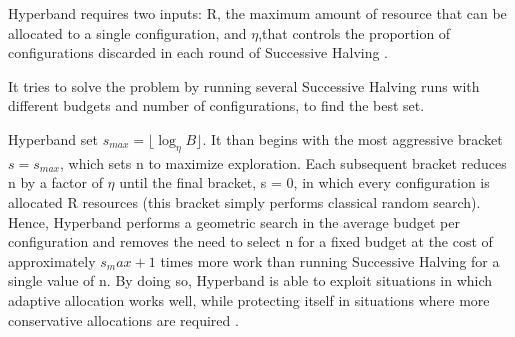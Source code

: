 Hyperband requires two inputs: R, the maximum amount of resource that can
be allocated to a single configuration, and \(\eta\),that controls the proportion of
configurations discarded in each round of Successive Halving \cite{li2016novel}.

It tries to solve the problem by running several Successive Halving runs with different budgets and number of configurations, to find the best set.

Hyperband set  \( s_{max} = \lfloor \log_\eta B \rfloor \). It than begins with the most aggressive 
bracket \(s = s_{max}\), which sets n to maximize exploration. 
Each subsequent bracket reduces n by a factor of \(\eta\) until the final bracket, s = 0, in which every configuration is allocated R resources (this bracket simply performs classical random search). 
Hence, Hyperband performs a geometric search in the average budget per configuration and removes the need
to select n for a fixed budget at the cost of approximately \(s_max + 1\) times more work than
running Successive Halving for a single value of n. 
By doing so, Hyperband is able to exploit situations in which adaptive allocation works well, while protecting itself in situations where more conservative allocations are required \cite{li2016novel}.
